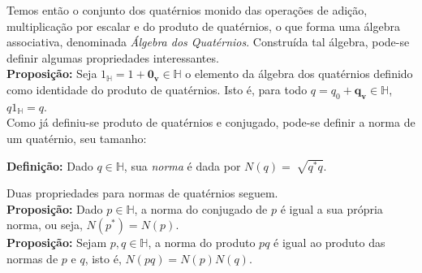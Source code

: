 \documentclass[a4paper,12pt]{report}
\theoremstyle{plain}
\theoremstyle{definition}
\begin{document}
Temos então o conjunto dos quatérnios monido das operações de adição, multiplicação por escalar e do produto de quatérnios, o que forma uma álgebra associativa, denominada \textit{Álgebra dos Quatérnios}. Construída tal álgebra, pode-se definir algumas propriedades interessantes.
\\

\textbf{Proposição:} Seja $1_\mathbb{H} = 1 + \mathbf{0_v} \in \mathbb{H}$ o elemento da álgebra dos quatérnios definido como identidade do produto de quatérnios. Isto é, para todo $q = q_0 + \mathbf{q_v} \in \mathbb{H}$, $q1_\mathbb{H} = q$.
\\

Como já definiu-se produto de quatérnios e conjugado, pode-se definir a norma de um quatérnio, seu tamanho:

\textbf{Definição:} Dado $q \in \mathbb{H}$, sua \textit{norma} é dada por $N(q) = \sqrt[]{q^*q}$. 

Duas propriedades para normas de quatérnios seguem. 
\\

\textbf{Proposição:} Dado $p \in \mathbb{H}$, a norma do conjugado de $p$ é igual a sua própria norma, ou seja, $N(p^*) = N(p)$.
\\

\textbf{Proposição:} Sejam $p, q \in \mathbb{H}$, a norma do produto $pq$ é igual ao produto das normas de $p$ e $q$, isto é, $N(pq) = N(p)N(q)$.
\\

{}



\end{document}
